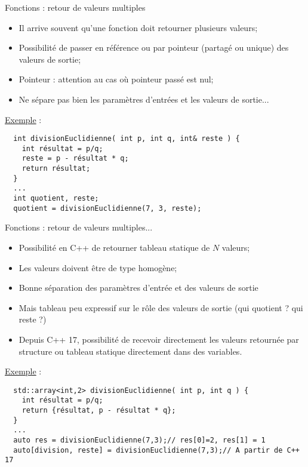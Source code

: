 \documentclass[compress,10pt,aspectratio=169]{beamer}
\begin{document}
  \begin{frame}[fragile]{Fonctions : retour de valeurs multiples}
    \scriptsize
  
    \begin{itemize}
  \item Il arrive souvent qu'une fonction doit retourner plusieurs valeurs;
  \item Possibilité de passer en référence ou par pointeur (partagé ou unique) des valeurs de sortie;
  \item \textcolor{NavyBlue}{Pointeur} : attention au cas où pointeur passé est nul;
  \item Ne sépare pas bien les paramètres d'entrées et les valeurs de sortie...
    \end{itemize}
  
    \underline{\textcolor{NavyBlue}{Exemple}} :
  \begin{verbatim}
  int divisionEuclidienne( int p, int q, int& reste ) {
    int résultat = p/q;
    reste = p - résultat * q;
    return résultat;
  }
  ...
  int quotient, reste;
  quotient = divisionEuclidienne(7, 3, reste);
  \end{verbatim}
  
  \end{frame}
  
  \begin{frame}[fragile]{Fonctions : retour de valeurs multiples...}
    \scriptsize
  
    \begin{itemize}
  \item Possibilité en C++ de retourner tableau statique de $N$ valeurs;
  \item Les valeurs doivent être de type homogène;
  \item Bonne séparation des paramètres d'entrée et des valeurs de sortie
  \item Mais tableau peu expressif sur le rôle des valeurs de sortie (qui quotient ? qui reste ?)
  \item Depuis C++ 17, possibilité de recevoir directement les valeurs retournée par structure ou tableau statique 
  directement dans des variables.
    \end{itemize}
    \underline{\textcolor{NavyBlue}{Exemple}} :
  \begin{verbatim}
  std::array<int,2> divisionEuclidienne( int p, int q ) {
    int résultat = p/q;
    return {résultat, p - résultat * q};
  }
  ... 
  auto res = divisionEuclidienne(7,3);// res[0]=2, res[1] = 1
  auto[division, reste] = divisionEuclidienne(7,3);// A partir de C++ 17
  \end{verbatim}
  \end{frame}
  
\end{document}
